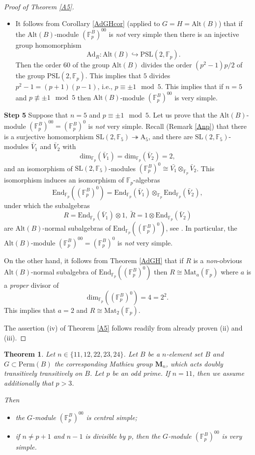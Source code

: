 \documentclass[12pt,a4paper,reqno]{amsart}
\def\F{{\mathbb F}}
\def\Alt{\mathrm{Alt}}
\def\End{\mathrm{End}}
\def\Mat{\mathrm{Mat}}
\def\SL{\mathrm{SL}}
\def\dim{\mathrm{dim}}
\newtheorem{thm}{Theorem}[section]
\theoremstyle{definition}
\begin{document}
\begin{proof}[Proof of Theorem \ref{A5}]
\begin{itemize}
\item
It follows from Corollary  \ref{AdGHcor} (applied to $G=H=\Alt(B)$) that if  the $\mathrm{Alt}(B)$-module $(\F_p^{B})^{00}$ is {\sl not} very simple
then there  is an injective  group homomorphism
$$ \mathrm{Ad}_R: \mathrm{Alt}(B) \hookrightarrow \mathrm{PSL}(2,\F_p).$$
Then the order $60$ of the group $\mathrm{Alt}(B)$ divides the order $(p^2-1)p/2$ of the group $\mathrm{PSL}(2,\F_p)$. This implies that $5$ divides $p^2-1=(p+1)(p-1)$, i.e.,
$p \equiv \pm 1 \ \bmod 5$. This implies that if $n=5$ and $p \not\equiv \pm 1 \ \bmod 5$ then $\mathrm{Alt}(B)$-module $(\F_p^{B})^{00}$ is  very simple.
\end{itemize}



{\bf Step 5} Suppose that $n=5$ and $p \equiv \pm 1 \ \bmod 5$. Let us prove that the $\mathrm{Alt}(B)$-module $(\F_p^{B})^{00}=(\F_p^{B})^{0}$ is {\sl not} very simple.
Recall (Remark \ref{Anp})  that there is a surjective homomorphism  $\SL(2,\F_5) \twoheadrightarrow \mathrm{A}_5$, and there are $\SL(2,\F_5) $-modules $\bar{V}_1$ and $\bar{V}_2$
with
$$\dim_{\F_p}(\bar{V}_1)=\dim_{\F_p}(\bar{V}_2)=2,$$
and an isomorphism of $\SL(2,\F_5) $-modules $(\F_p^{B})^{0}\cong \bar{V_1}\otimes_{\F_p}\bar{V}_2$. This isomorphism induces an isomorphism of $\F_p$-algebras
$$\End_{\F_p}((\F_p^{B})^{0})=\End_{\F_p}(\bar{V}_1)\otimes_{\F_p}\End_{\F_p}(\bar{V}_2),$$
under which the subalgebras
$$R= \End_{\F_p}(\bar{V}_1)\otimes 1,  \ \tilde{R}=1\otimes  \End_{\F_p}(\bar{V}_2)$$
are $\mathrm{Alt}(B)$-normal subalgebras of $\End_{\F_p}((\F_p^{B})^{0})$, see \cite[Example 3.1(ii)]{ZarhinClifford}. In particular, the
$\mathrm{Alt}(B)$-module $(\F_p^{B})^{00}=(\F_p^{B})^{0}$ is {\sl not} very simple.

On the other hand, it follows from Theorem \ref{AdGH} that if $R$ is a {\sl non}-obvious $\mathrm{Alt}(B)$-normal subalgebra of $\End_{\F_p}((\F_p^{B})^{0})$
then $R \cong \Mat_a(\F_p)$ where $a$ is a {\sl proper} divisor of 
$$\dim_{\F_p}((\F_p^{B})^{0})=4=2^2.$$
This implies that $a=2$ and $R \cong \Mat_2(\F_p)$.


The  assertion (iv) of Theorem \ref{A5} follows readily from already proven (ii) and (iii).
\end{proof}

\begin{thm}
\label{mathieuCentral}
Let $n \in \{11,12,22,23,24\}$.  Let $B$ be a   $n$-element set $B$ and 
$G\subset \mathrm{Perm}(B)$ the corresponding Mathieu group
  $\mathbf{M}_n$, which acts doubly transitively transitively on $B$.
Let $p$ be an odd prime. If $n=11$, then we assume additionally that $p>3$.

Then 
\begin{itemize}
\item
the $G$-module $(\F_p^{B})^{00}$ is central simple;
\item
if $n \ne p+1$ and $n-1$ is divisible by $p$, then the $G$-module $(\F_p^{B})^{00}$ is very simple. 
\end{itemize}
\end{thm}
\end{document}
